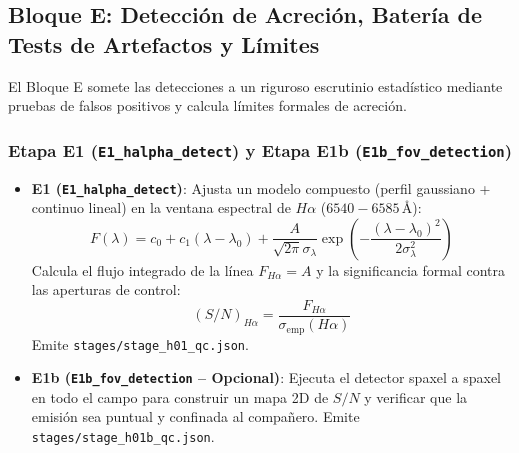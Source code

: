 \documentclass[11pt,a4paper]{article}
\begin{document}
\subsection{Bloque E: Detección de Acreción, Batería de Tests de Artefactos y Límites}

El Bloque E somete las detecciones a un riguroso escrutinio estadístico mediante pruebas de falsos positivos y calcula límites formales de acreción.

\subsubsection{Etapa E1 (\texttt{E1\_halpha\_detect}) y Etapa E1b (\texttt{E1b\_fov\_detection})}
\begin{itemize}[leftmargin=1.0cm]
    \item \textbf{E1 (\texttt{E1\_halpha\_detect})}: Ajusta un modelo compuesto (perfil gaussiano + continuo lineal) en la ventana espectral de $H\alpha$ ($6540 - 6585\,\text{\AA}$):
    $$F(\lambda) = c_0 + c_1(\lambda - \lambda_0) + \frac{A}{\sqrt{2\pi}\sigma_\lambda} \exp\left(-\frac{(\lambda - \lambda_0)^2}{2\sigma_\lambda^2}\right)$$
    Calcula el flujo integrado de la línea $F_{H\alpha} = A$ y la significancia formal contra las aperturas de control:
    $$(S/N)_{H\alpha} = \frac{F_{H\alpha}}{\sigma_\text{emp}(H\alpha)}$$
    Emite \texttt{stages/stage\_h01\_qc.json}.
    \item \textbf{E1b (\texttt{E1b\_fov\_detection} -- Opcional)}: Ejecuta el detector spaxel a spaxel en todo el campo para construir un mapa 2D de $S/N$ y verificar que la emisión sea puntual y confinada al compañero. Emite \texttt{stages/stage\_h01b\_qc.json}.
\end{itemize}
\end{document}
